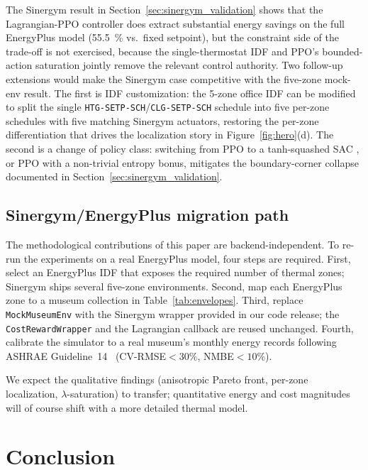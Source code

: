 \documentclass[11pt,a4paper]{article}
\begin{document}
The Sinergym result in Section~\ref{sec:sinergym_validation} shows
that the Lagrangian-PPO controller does extract substantial energy
savings on the full EnergyPlus model (\SI{55.5}{\percent} vs.\ fixed
setpoint), but the constraint side of the trade-off is not exercised,
because the single-thermostat IDF and PPO's bounded-action saturation
jointly remove the relevant control authority. Two follow-up
extensions would make the Sinergym case competitive with the
five-zone mock-env result. The first is IDF customization: the 5-zone
office IDF can be modified to split the single
\texttt{HTG-SETP-SCH}/\texttt{CLG-SETP-SCH} schedule into five
per-zone schedules with five matching Sinergym actuators, restoring
the per-zone differentiation that drives the localization story in
Figure~\ref{fig:hero}(d). The second is a change of policy class:
switching from PPO to a tanh-squashed SAC
\citep{ji2023omnisafe}, or PPO with a
non-trivial entropy bonus, mitigates the boundary-corner collapse
documented in Section~\ref{sec:sinergym_validation}.

\subsection{Sinergym/EnergyPlus migration path}

The methodological contributions of this paper are
backend-independent. To re-run the experiments on a real EnergyPlus
model, four steps are required. First, select an EnergyPlus IDF that
exposes the required number of thermal zones; Sinergym ships several
five-zone environments. Second, map each EnergyPlus zone to a museum
collection in Table~\ref{tab:envelopes}. Third, replace
\texttt{MockMuseumEnv} with the Sinergym wrapper provided in our code
release; the \texttt{CostRewardWrapper} and the Lagrangian callback
are reused unchanged. Fourth, calibrate the simulator to a real
museum's monthly energy records following ASHRAE
Guideline~14~\citep{ashrae_guideline14} (CV-RMSE${<}30\%$,
NMBE${<}10\%$).

We expect the qualitative findings (anisotropic Pareto front, per-zone
localization, $\lambda$-saturation) to transfer; quantitative energy
and cost magnitudes will of course shift with a more detailed thermal
model.

\section{Conclusion}\label{sec:conclusion}
\end{document}
